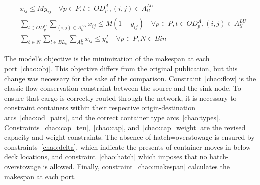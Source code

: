 \documentclass[preprint,12pt,authoryear]{elsarticle}
\begin{document}
\begin{align}
    &x_{ij} \leq M y_{ij} \quad \forall p\in P, t \in OD^A_p, (i,j)\in A^{LU}_{tl}\label{chao:delta}\\
    &\sum_{t\in OD^O_p}\sum_{(i,j)\in A^{LO}_{tl}} x_{ij} \leq M(1- y_{ij}) \quad \forall p\in P, t \in OD^A_p, (i,j)\in A^{LU}_{tl}\label{chao:hatch}\\
    &\sum_{b\in N}\sum_{l\in BL_b}\sum_{A^L_{tl}} x_{ij}\leq y^T_p \quad \forall p\in P, N \in Bin \label{chao:makespan}
\end{align}

The model's objective is the minimization of the makespan at each port~\eqref{chao:obj}. This objective differs from the original publication, but this change was necessary for the sake of the comparison. Constraint~\eqref{chao:flow} is the classic flow-conservation constraint between the source and the sink node. To ensure that cargo is correctly routed through the network, it is necessary to constraint containers within their respective origin-destination arcs~\eqref{chao:od_pairs}, and the correct container type arcs~\eqref{chao:types}. Constraints~\eqref{chao:cap_teu},~\eqref{chao:cap}, and~\eqref{chao:cap_weight} are the revised capacity and weight constraints. The absence of hatch=overstowage is ensured by constraints~\eqref{chao:delta}, which indicate the presents of container moves in below deck locations, and constraint~\eqref{chao:hatch} which imposes that no hatch-overstowage is allowed. Finally, constraint~\eqref{chao:makespan} calculates the makespan at each port.

    

\def\urlprefix{}
\def\url#1{}



\end{document}
